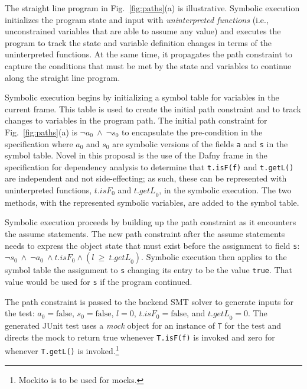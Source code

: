 \documentclass[11pt,onecolumn,notitlepage]{article}
\newcommand{\figref}[1]{Fig.~\ref{#1}}
\begin{document}
The straight line program in \figref{fig:paths}(a) is illustrative. Symbolic execution initializes the program state and input with \emph{uninterpreted functions} (i.e., unconstrained variables that are able to assume any value) and executes the program to track the state and variable definition changes in terms of the uninterpreted functions. At the same time, it propagates the path constraint to capture the conditions that must be met by the state and variables to continue along the straight line program.

Symbolic execution begins by initializing a symbol table for variables in the current frame. This table is used to create the initial path constraint and to track changes to variables in the program path. The initial path constraint for \figref{fig:paths}(a) is $\neg a_0\ \wedge\ \neg s_0$ to encapsulate the pre-condition in the specification where $a_0$ and $s_0$ are symbolic versions of the fields \texttt{a} and \texttt{s} in the symbol table. Novel in this proposal is the use of the Dafny frame in the specification for dependency analysis to determine that \texttt{t.isF(f)} and \texttt{t.getL()} are independent and not side-effecting; as such, these can be represented with uninterpreted functions, $\mathit{t.isF}_0$ and $\mathit{t.getL}_0$, in the symbolic execution. The two methods, with the represented symbolic variables, are added to the symbol table.

Symbolic execution proceeds by building up the path constraint as it encounters the assume statements. The new path constraint after the assume statements needs to express the object state that must exist before the assignment to field \texttt{s}: $\neg s_0\ \wedge\ \neg a_0\ \wedge \mathit{t.isF}_0 \wedge (l\ \ge\ \mathit{t.getL}_0)$. Symbolic execution then applies to the symbol table the assignment to \texttt{s} changing its entry to be the value \texttt{true}. That value would be used for \texttt{s} if the program continued.

The path constraint is passed to the backend SMT solver to generate inputs for the test: $a_0 = \mathrm{false}$, $s_0 = \mathrm{false}$, $\mathit{l} = 0$, $\mathit{t.isF}_0 = \mathrm{false}$, and $\mathit{t.getL}_0 = 0$. The generated JUnit test uses a \emph{mock} object for an instance of \texttt{T} for the test and directs the mock to return true whenever \texttt{T.isF(f)} is invoked and zero for whenever \texttt{T.getL()} is invoked.\footnote{Mockito is to be used for mocks.} 
\end{document}
